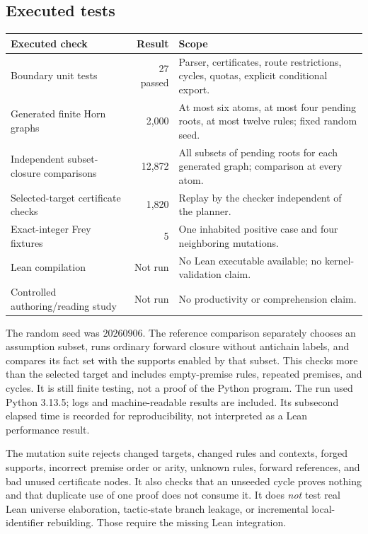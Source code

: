 \documentclass[11pt,a4paper]{article}
\theoremstyle{definition}
\theoremstyle{remark}
\begin{document}
\subsection{Executed tests}
\begin{center}\small
\begin{tabularx}{\textwidth}{@{}L{.48\textwidth}rY@{}}
\toprule
Executed check & Result & Scope\\
\midrule
Boundary unit tests & 27 passed & Parser, certificates, route restrictions, cycles, quotas, explicit conditional export.\\
Generated finite Horn graphs & 2,000 & At most six atoms, at most four pending roots, at most twelve rules; fixed random seed.\\
Independent subset-closure comparisons & 12,872 & All subsets of pending roots for each generated graph; comparison at every atom.\\
Selected-target certificate checks & 1,820 & Replay by the checker independent of the planner.\\
Exact-integer Frey fixtures & 5 & One inhabited positive case and four neighboring mutations.\\
Lean compilation & Not run & No Lean executable available; no kernel-validation claim.\\
Controlled authoring/reading study & Not run & No productivity or comprehension claim.\\
\bottomrule
\end{tabularx}
\end{center}

The random seed was $20260906$. The reference comparison separately chooses an
assumption subset, runs ordinary forward closure without antichain labels, and
compares its fact set with the supports enabled by that subset. This checks
more than the selected target and includes empty-premise rules, repeated
premises, and cycles. It is still finite testing, not a proof of the Python
program. The run used Python 3.13.5; logs and machine-readable results are
included. Its subsecond elapsed time is recorded for reproducibility, not
interpreted as a Lean performance result.

The mutation suite rejects changed targets, changed rules and contexts,
forged supports, incorrect premise order or arity, unknown rules, forward
references, and bad unused certificate nodes. It also checks that an unseeded
cycle proves nothing and that duplicate use of one proof does not consume it.
It does \emph{not} test real Lean universe elaboration, tactic-state branch
leakage, or incremental local-identifier rebuilding. Those require the missing
Lean integration.
\end{document}
